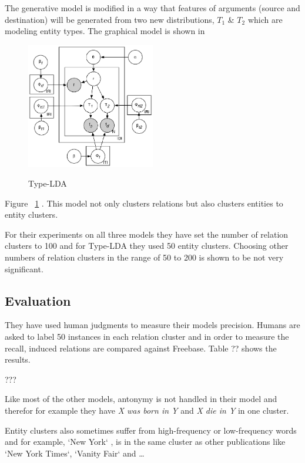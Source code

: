 \documentclass[12pt]{report}
\begin{document}
    The generative model is modified in a way that features of arguments (source and destination)
    will be generated from two new distributions, $T_1$ \& $T_2$ which are modeling entity types. The graphical model
    is shown in
     \begin{figure}[h!]
  \caption{Type-LDA}
  \centering
    \includegraphics[width=0.5\textwidth]{type-lda.eps}
    \label{fig:type-lda}
\end{figure} 
Figure ~\ref{fig:type-lda} .
    This model not only clusters relations but also clusters entities to entity clusters.
    
    For their experiments on all three models they have set the number of relation clusters to 100 and for Type-LDA they used 
     50 entity clusters. Choosing other numbers of relation clusters in the range of 50 to 200 is shown to be not very significant.
    
\subsection {Evaluation}
\label{ch:evaluation}

They have used human judgments 
 to measure their models precision. Humans are asked to label 50 instances in each relation cluster and in order to measure
 the recall, induced relations are compared against Freebase. Table ?? shows the results.
 
 ???
 
 Like most of the other models, antonymy is not handled in their model and therefor for example they have
 \emph{X was born in Y} and \emph{X die in Y} in one cluster.
 
 Entity clusters also sometimes suffer from high-frequency or low-frequency words and for example, `New York`
 , is in the same cluster as other publications like `New York Times`, `Vanity Fair` and \ldots
 
\end{document}
